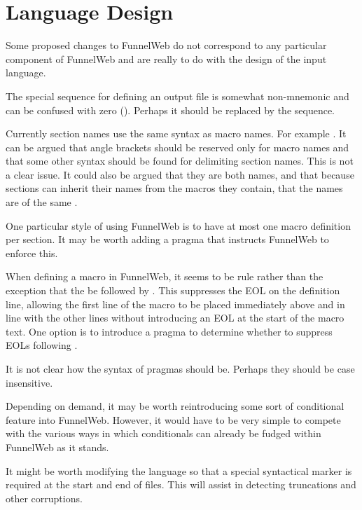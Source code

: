 \section{Language Design}

Some proposed changes to FunnelWeb do not correspond to
any particular component of FunnelWeb
and are really to do with the design of the input language.

 The  special sequence for defining an output
file is somewhat non-mnemonic and can be confused with zero (). Perhaps
it should be replaced by the  sequence.

 Currently section names use
the same syntax as macro names. For example . It can be
argued that angle brackets should be reserved only for macro names and that
some other syntax should be found for delimiting section names. This is not
a clear issue. It could also be argued that they are both names, and that
because sections can inherit their names from the macros they contain, that
the names are of the same .

 One particular style of using FunnelWeb is
to have at most one macro definition per section. It may be worth adding
a pragma that instructs FunnelWeb to enforce this.

 When defining a macro in FunnelWeb, it
seems to be rule rather than the exception that the
 be followed by . This suppresses the EOL on the definition
line, allowing the first line of the macro to be placed immediately
above and in line with the other
lines without introducing an EOL at the start of the macro text.
One option is to introduce a pragma to determine whether to suppress EOLs
following .

 It is not clear how  the syntax of pragmas
should be. Perhaps they should be case insensitive.

 Depending on demand, it may be worth reintroducing
some sort of conditional feature into FunnelWeb. However, it would have to
be very simple to compete with the various ways in which conditionals
can already be fudged within FunnelWeb as it stands.

 It might be worth modifying the language so that
a special syntactical marker is required at the start and end of files.
This will assist in detecting truncations and other
corruptions.

